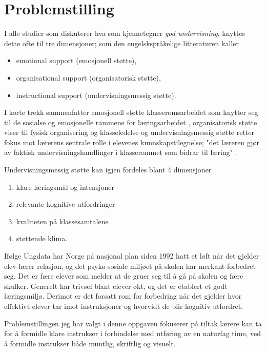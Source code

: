 \documentclass[main.tex]{subfiles}
\begin{document}
\section{Problemstilling}    
I alle studier som diskuterer hva som kjennetegner \emph{god undervisning}, knyttes 
dette ofte til tre dimensjoner\cite[Klette 2013, side 142]{klette}; som den 
engelskspråkelige litteraturen kaller 
\begin{itemize}
\item emotional support (emosjonell støtte),
\item organisational support (organisatorisk støtte),
\item instructional support (undervisningsmessig støtte).
\end{itemize}
I korte trekk sammenfatter emosjonell støtte klasseromsarbeidet som knytter
seg til de sosialse og emosjonelle rammene for læringsarbeidet \cite[Klette 2013, side 143]{klette},
organisatorisk støtte viser til fysisk organisering og klasseledelse \cite[Klette 2013, side189]{klette}
og undervisningsmessig støtte retter fokus mot lærerens sentrale rolle i elevenes kunnskapstilegnelse; "det 
læreren gjør av faktisk undervisningshandlinger i klasserommet som bidrar til læring" 
\cite[Klette 2013, side 143 og 146]{klette}.
\newline

Undervisningsmessig støtte kan igjen fordeles blant 4 dimensjoner\cite[Klette 2013, side 146]{klette}
\begin{enumerate}
\item klare læringsmål og intensjoner
\item relevante kognitive utfordringer
\item kvaliteten på klassesamtalene
\item støttende klima.
\end{enumerate}

Ifølge Ungdata\cite{ungdata}\cite[Klette, side 144]{klette} har Norge på nasjonal 
plan siden 1992 hatt et løft når det gjelder elev-lærer 
relasjon, og det psyko-sosiale miljøet på skolen har merkant 
forbedret seg. Det er fære elever som melder at de gruer seg til å 
gå på skolen og fære skulker. Generelt har trivsel 
blant elever økt, og det er etablert et godt læringsmiljø. Derimot er det 
forsatt rom for forbedring når det gjelder hvor effektivt elever tar imot 
instruksjoner og hvorvidt de blir kognitiv utfordret. 
\newline

Problemstillingen jeg har valgt i denne oppgaven fokuserer på tiltak lærere kan ta for å
formidle klare instrukser i forbindelse med utføring av en naturfag time, ved å formidle instrukser 
både muntlig, skriftlig og visuelt.
\newline
\end{document}

